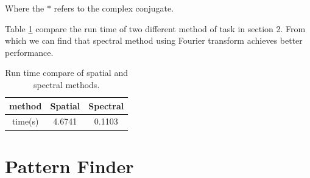 Where the $*$ refers to the complex conjugate.

Table \ref{tab:run_time} compare the run time of two different method of task in section 2. From which we can find that spectral method using Fourier transform achieves better performance.

\begin{table}[h!]
	\centering
	\begin{tabular}{c|c|c}
		\hline
		method & Spatial  & Spectral \\
		\hline
		time(s) & 4.6741 & 0.1103 \\
		\hline
	\end{tabular}
	\caption{Run time compare of spatial and spectral methods.}
	\label{tab:run_time}
\end{table}

\section{Pattern Finder}


